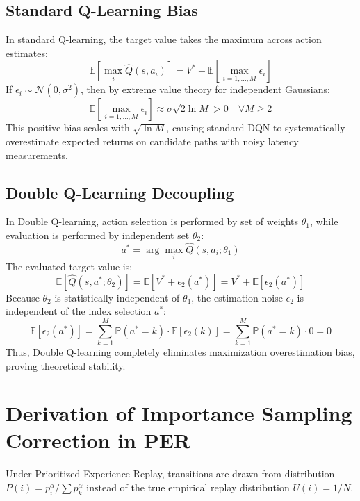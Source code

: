 \subsection{Standard Q-Learning Bias}
In standard Q-learning, the target value takes the maximum across action estimates:
\begin{equation}
    \mathbb{E}\left[ \max_i \hat{Q}(s, a_i) \right] = V^* + \mathbb{E}\left[ \max_{i=1,\dots,M} \epsilon_i \right]
\end{equation}
If $\epsilon_i \sim \mathcal{N}(0, \sigma^2)$, then by extreme value theory for independent Gaussians:
\begin{equation}
    \mathbb{E}\left[ \max_{i=1,\dots,M} \epsilon_i \right] \approx \sigma \sqrt{2 \ln M} > 0 \quad \forall M \ge 2
\end{equation}
This positive bias scales with $\sqrt{\ln M}$, causing standard DQN to systematically overestimate expected returns on candidate paths with noisy latency measurements.

\subsection{Double Q-Learning Decoupling}
In Double Q-learning, action selection is performed by set of weights $\theta_1$, while evaluation is performed by independent set $\theta_2$:
\begin{equation}
    a^* = \arg\max_i \hat{Q}(s, a_i; \theta_1)
\end{equation}
The evaluated target value is:
\begin{equation}
    \mathbb{E}\left[ \hat{Q}(s, a^*; \theta_2) \right] = \mathbb{E}\left[ V^* + \epsilon_2(a^*) \right] = V^* + \mathbb{E}[\epsilon_2(a^*)]
\end{equation}
Because $\theta_2$ is statistically independent of $\theta_1$, the estimation noise $\epsilon_2$ is independent of the index selection $a^*$:
\begin{equation}
    \mathbb{E}[\epsilon_2(a^*)] = \sum_{k=1}^M \mathbb{P}(a^* = k) \cdot \mathbb{E}[\epsilon_2(k)] = \sum_{k=1}^M \mathbb{P}(a^* = k) \cdot 0 = 0
\end{equation}
Thus, Double Q-learning completely eliminates maximization overestimation bias, proving theoretical stability.

\section{Derivation of Importance Sampling Correction in PER}
Under Prioritized Experience Replay, transitions are drawn from distribution $P(i) = p_i^\alpha / \sum p_k^\alpha$ instead of the true empirical replay distribution $U(i) = 1/N$.

